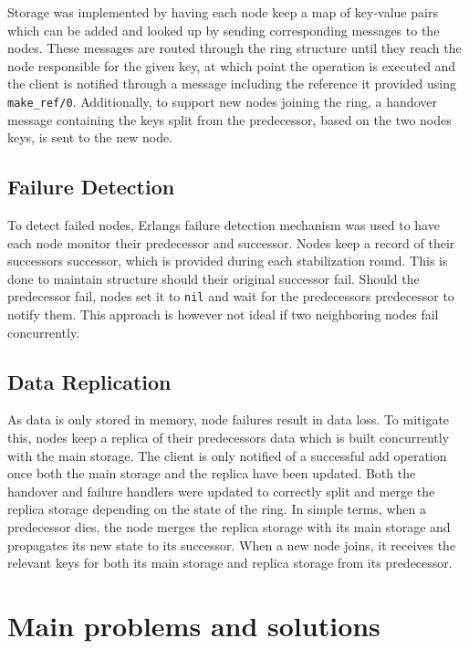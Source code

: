 \documentclass[a4paper, 11pt]{article}
\begin{document}
Storage was implemented by having each node keep a map of key-value pairs which can be added and looked up by sending corresponding messages to the nodes.
These messages are routed through the ring structure until they reach the node responsible for the given key,
at which point the operation is executed and the client is notified through a message including the reference it provided using \texttt{make\_ref/0}.
Additionally, to support new nodes joining the ring, a handover message containing the keys split from the predecessor, based on the two nodes keys, is sent to the new node.

\subsection{Failure Detection}

To detect failed nodes, Erlangs failure detection mechanism was used to have each node monitor their predecessor and successor.
Nodes keep a record of their successors successor, which is provided during each stabilization round. This is done to maintain structure should their original successor fail.
Should the predecessor fail, nodes set it to \texttt{nil} and wait for the predecessors predecessor to notify them.
This approach is however not ideal if two neighboring nodes fail concurrently.

\subsection{Data Replication}

As data is only stored in memory, node failures result in data loss. To mitigate this, nodes keep a replica of their predecessors data which is built concurrently with the main storage.
The client is only notified of a successful add operation once both the main storage and the replica have been updated.
Both the handover and failure handlers were updated to correctly split and merge the replica storage depending on the state of the ring.
In simple terms, when a predecessor dies, the node merges the replica storage with its main storage and propagates its new state to its successor.
When a new node joins, it receives the relevant keys for both its main storage and replica storage from its predecessor.

\section{Main problems and solutions}
\end{document}
